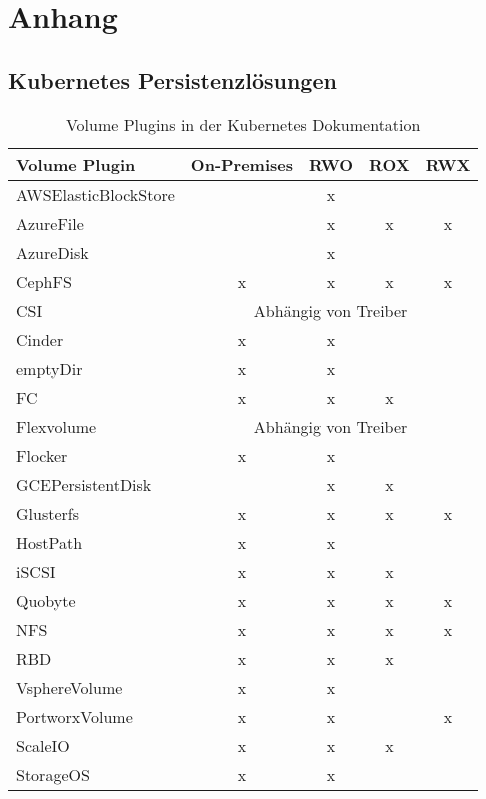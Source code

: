 \chapter{Anhang}
\section{Kubernetes Persistenzlösungen}
\begin{table}[h!]
    \centering
    \begin{tabular}{lcccc} \hline
    \textbf{Volume Plugin} & \textbf{On-Premises} & \textbf{RWO} & \textbf{ROX} & \textbf{RWX}\\ \hline
    AWSElasticBlockStore & & x & & \\
    AzureFile & & x & x & x \\
    AzureDisk & & x & & \\
    CephFS & x & x & x & x\\
    CSI & \multicolumn{4}{c}{Abhängig von Treiber} \\
    Cinder & x & x & & \\
    emptyDir & x & x& & \\
    FC & x & x & x & \\
    Flexvolume & \multicolumn{4}{c}{Abhängig von Treiber} \\
    Flocker & x & x & & \\
    GCEPersistentDisk & & x & x& \\
    Glusterfs & x & x & x& x\\
    HostPath & x & x & & \\
    iSCSI & x & x &x & \\
    Quobyte & x & x & x& x\\
    NFS & x & x & x& x\\
    RBD & x & x &x & \\
    VsphereVolume & x & x & & \\
    PortworxVolume & x & x & & x \\
    ScaleIO & x & x & x& \\
    StorageOS & x & x & & \\

	 \end{tabular}
    \caption{Volume Plugins in der Kubernetes Dokumentation}
    \label{marktuebersicht}
 \end{table}
